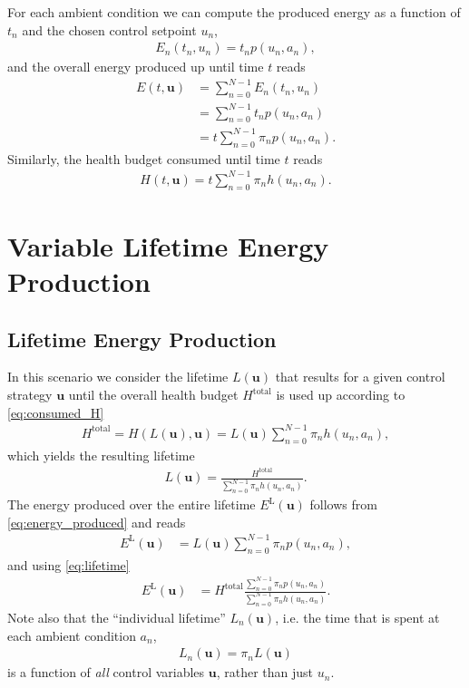 \documentclass{article}
\begin{document}
    For each ambient condition we can compute the produced energy as a function of $t_n$ and the chosen control setpoint $u_n$,
    \begin{align}
        E_n(t_n, u_n) = t_n p(u_n, a_n),
    \end{align}
    and the overall energy produced up until time $t$ reads
    \begin{align}
        E(t, \boldsymbol{u}) &= \sum_{n = 0}^{N - 1}E_n(t_n, u_n)\\
        &= \sum_{n = 0}^{N - 1}t_n p(u_n, a_n)\\
        &= t \sum_{n = 0}^{N - 1}\pi_n p(u_n, a_n).\label{eq:energy_produced}
    \end{align}
    Similarly, the health budget consumed until time $t$ reads
    \begin{align}
        H(t, \boldsymbol{u}) = t \sum_{n = 0}^{N - 1}\pi_n h(u_n, a_n).\label{eq:consumed_H}
    \end{align}

    \section{Variable Lifetime Energy Production}
    \subsection{Lifetime Energy Production}
    In this scenario we consider the lifetime $L(\boldsymbol{u})$ that results for a given control strategy $\boldsymbol{u}$ until the overall health budget $H^\text{total}$ is used up according to \eqref{eq:consumed_H}
    \begin{align}
        H^\text{total} = H(L(\boldsymbol{u}), \boldsymbol{u}) = L(\boldsymbol{u}) \sum_{n = 0}^{N - 1}\pi_n h(u_n, a_n),
    \end{align}
    which yields the resulting lifetime
    \begin{align}
        L(\boldsymbol{u}) = \frac{H^\text{total}}{\sum_{n = 0}^{N - 1}\pi_n h(u_n, a_n)}.\label{eq:lifetime}
    \end{align}
    The energy produced over the entire lifetime $E^\text{L}(\boldsymbol{u})$ follows from \eqref{eq:energy_produced} and reads
    \begin{align}
        E^\text{L}(\boldsymbol{u}) &= L(\boldsymbol{u}) \sum_{n = 0}^{N - 1}\pi_n p(u_n, a_n),
    \end{align}
    and using \eqref{eq:lifetime}
    \begin{align}
        E^\text{L}(\boldsymbol{u}) &= H^\text{total} \frac{\sum_{n = 0}^{N - 1} \pi_n p(u_n, a_n)}{\sum_{n = 0}^{N - 1} \pi_n h(u_n, a_n)}.\label{eq:lifetime_energy}
    \end{align}
    Note also that the ``individual lifetime'' $L_n(\boldsymbol{u})$, i.e. the time that is spent at each ambient condition $a_n$,
    \begin{align}
        L_n(\boldsymbol{u}) =  \pi_n L(\boldsymbol{u})
    \end{align}
    is a function of \textit{all} control variables $\boldsymbol{u}$, rather than just $u_n$.
\end{document}
